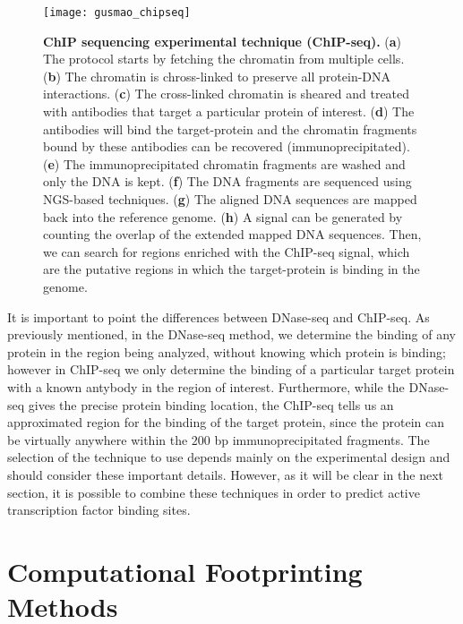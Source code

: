 \begin{figure}[h!]
\centering
\texttt{[image: gusmao\_chipseq]}
\caption[ChIP sequencing experimental technique (ChIP-seq)]{\textbf{ChIP sequencing experimental technique (ChIP-seq).} (\textbf{a}) The protocol starts by fetching the chromatin from multiple cells. (\textbf{b}) The chromatin is chross-linked to preserve all protein-DNA interactions. (\textbf{c}) The cross-linked chromatin is sheared and treated with antibodies that target a particular protein of interest. (\textbf{d}) The antibodies will bind the target-protein and the chromatin fragments bound by these antibodies can be recovered (immunoprecipitated). (\textbf{e}) The immunoprecipitated chromatin fragments are washed and only the DNA is kept. (\textbf{f}) The DNA fragments are sequenced using NGS-based techniques. (\textbf{g}) The aligned DNA sequences are mapped back into the reference genome. (\textbf{h}) A signal can be generated by counting the overlap of the extended mapped DNA sequences. Then, we can search for regions enriched with the ChIP-seq signal, which are the putative regions in which the target-protein is binding in the genome.}
\label{fig:gusmao_chipseq}
\end{figure}

It is important to point the differences between DNase-seq and ChIP-seq. As previously mentioned, in the DNase-seq method, we determine the binding of any protein in the region being analyzed, without knowing which protein is binding; however in ChIP-seq we only determine the binding of a particular target protein with a known antybody in the region of interest. Furthermore, while the DNase-seq gives the precise protein binding location, the ChIP-seq tells us an approximated region for the binding of the target protein, since the protein can be virtually anywhere within the \approxy$200$ bp immunoprecipitated fragments. The selection of the technique to use depends mainly on the experimental design and should consider these important details. However, as it will be clear in the next section, it is possible to combine these techniques in order to predict active transcription factor binding sites.

\section{Computational Footprinting Methods}
\label{sec:computational.footprinting.methods}

